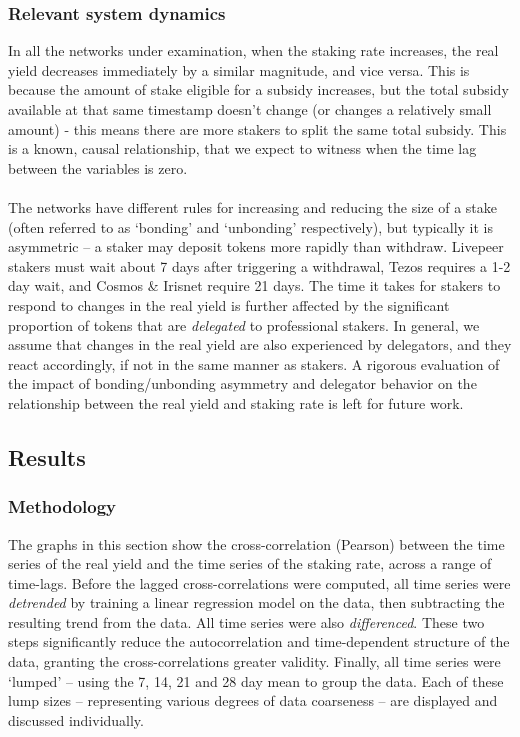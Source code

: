 \documentclass[longbibliography,nofootinbib]{revtex4-1}
\begin{document}
\subsubsection{Relevant system dynamics}\label{dynamics}

In all the networks under examination, when the staking rate increases, the real yield decreases immediately by a similar magnitude, and vice versa. This is because the amount of stake eligible for a subsidy increases, but the total subsidy available at that same timestamp doesn't change (or changes a relatively small amount) - this means there are more stakers to split the same total subsidy. This is a known, causal relationship, that we expect to witness when the time lag between the variables is zero. 
\\\\
The networks have different rules for increasing and reducing the size of a stake (often referred to as `bonding' and `unbonding' respectively), but typically it is asymmetric – a staker may deposit tokens more rapidly than withdraw. Livepeer stakers must wait about 7 days after triggering a withdrawal, Tezos requires a 1-2 day wait, and Cosmos \& Irisnet require 21 days. The time it takes for stakers to respond to changes in the real yield is further affected by the significant proportion of tokens that are \textit{delegated} to professional stakers. In general, we assume that changes in the real yield are also experienced by delegators, and they react accordingly, if not in the same manner as stakers. A rigorous evaluation of the impact of bonding/unbonding asymmetry and delegator behavior on the relationship between the real yield and staking rate is left for future work.

\subsection{Results}

\subsubsection{Methodology}

The graphs in this section show the cross-correlation (Pearson) between the time series of the real yield and the time series of the staking rate, across a range of time-lags. Before the lagged cross-correlations were computed, all time series were \textit{detrended} by training a linear regression model on the data, then subtracting the resulting trend from the data. All time series were also \textit{differenced}. These two steps significantly reduce the autocorrelation and time-dependent structure of the data, granting the cross-correlations greater validity. Finally, all time series were `lumped' – using the 7, 14, 21 and 28 day mean to group the data. Each of these lump sizes – representing various degrees of data coarseness – are displayed and discussed individually.
\end{document}
